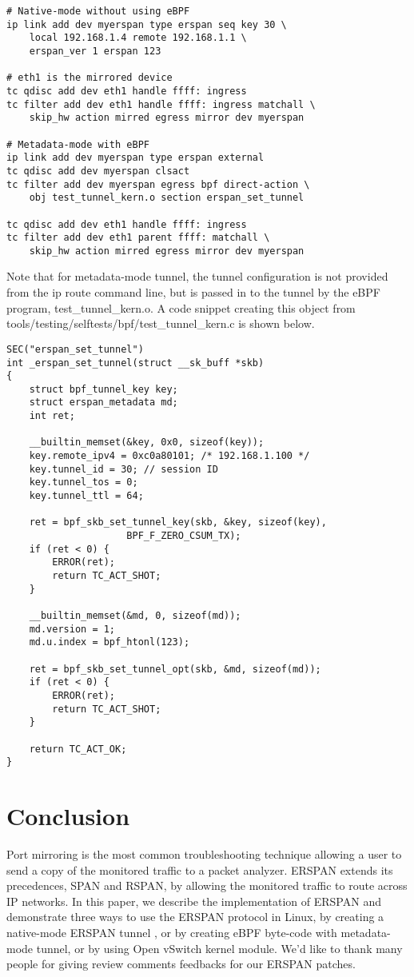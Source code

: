 \documentclass[10pt]{sigplanconf}
\begin{document}
{\footnotesize
\begin{verbatim}
# Native-mode without using eBPF
ip link add dev myerspan type erspan seq key 30 \
    local 192.168.1.4 remote 192.168.1.1 \
    erspan_ver 1 erspan 123

# eth1 is the mirrored device
tc qdisc add dev eth1 handle ffff: ingress
tc filter add dev eth1 handle ffff: ingress matchall \
    skip_hw action mirred egress mirror dev myerspan

# Metadata-mode with eBPF
ip link add dev myerspan type erspan external
tc qdisc add dev myerspan clsact
tc filter add dev myerspan egress bpf direct-action \
    obj test_tunnel_kern.o section erspan_set_tunnel
    
tc qdisc add dev eth1 handle ffff: ingress
tc filter add dev eth1 parent ffff: matchall \
    skip_hw action mirred egress mirror dev myerspan
\end{verbatim}
}
Note that for metadata-mode tunnel, the tunnel configuration is not
provided from the ip route command line, but is passed in to the tunnel
by the eBPF program, test\_tunnel\_kern.o. A code snippet creating this
object from tools/testing/selftests/bpf/test\_tunnel\_kern.c is shown below.
{\footnotesize
\begin{verbatim}
SEC("erspan_set_tunnel")
int _erspan_set_tunnel(struct __sk_buff *skb)
{
    struct bpf_tunnel_key key;
    struct erspan_metadata md; 
    int ret;

    __builtin_memset(&key, 0x0, sizeof(key));
    key.remote_ipv4 = 0xc0a80101; /* 192.168.1.100 */
    key.tunnel_id = 30; // session ID
    key.tunnel_tos = 0;
    key.tunnel_ttl = 64;

    ret = bpf_skb_set_tunnel_key(skb, &key, sizeof(key),
                     BPF_F_ZERO_CSUM_TX);
    if (ret < 0) {
        ERROR(ret);
        return TC_ACT_SHOT;
    }

    __builtin_memset(&md, 0, sizeof(md));
    md.version = 1;
    md.u.index = bpf_htonl(123);

    ret = bpf_skb_set_tunnel_opt(skb, &md, sizeof(md));
    if (ret < 0) {
        ERROR(ret);
        return TC_ACT_SHOT;
    }

    return TC_ACT_OK;
}
\end{verbatim}
}
\section{Conclusion}
Port mirroring is the most common troubleshooting technique
allowing a user to send a copy of the monitored traffic to a packet analyzer.
ERSPAN extends its precedences, SPAN and RSPAN, by allowing the monitored
traffic to route across IP networks.
In this paper, we describe the implementation of ERSPAN and demonstrate three
ways to use the ERSPAN protocol in Linux, by creating a native-mode ERSPAN tunnel
, or by creating eBPF byte-code with metadata-mode tunnel, or by using Open
vSwitch kernel module. 
We'd like to thank many people for giving review comments feedbacks for our
ERSPAN patches.
\end{document}
